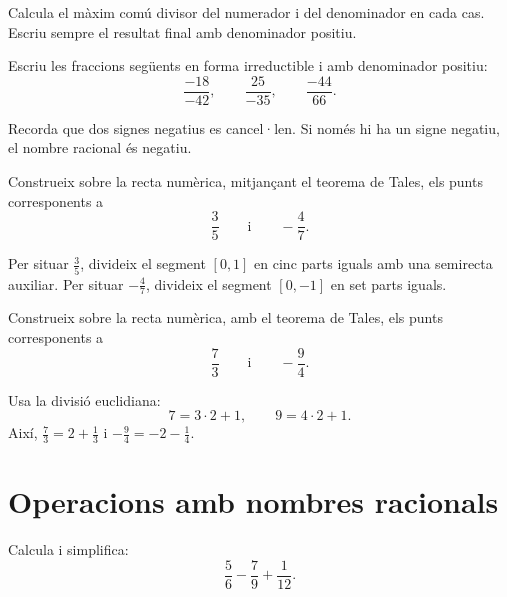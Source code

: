 \begin{indicacio}
	Calcula el màxim comú divisor del numerador i del denominador en cada cas. Escriu sempre el resultat final amb denominador positiu.
\end{indicacio}

\begin{exercici}
	Escriu les fraccions següents en forma irreductible i amb denominador positiu:
	\[
	\frac{-18}{-42},
	\qquad
	\frac{25}{-35},
	\qquad
	\frac{-44}{66}.
	\]
\end{exercici}

\begin{indicacio}
	Recorda que dos signes negatius es cancel·len. Si només hi ha un signe negatiu, el nombre racional és negatiu.
\end{indicacio}

\begin{exercici}
	Construeix sobre la recta numèrica, mitjançant el teorema de Tales, els punts corresponents a
	\[
	\frac{3}{5}
	\qquad\text{i}\qquad
	-\frac{4}{7}.
	\]
\end{exercici}

\begin{indicacio}
	Per situar \(\frac{3}{5}\), divideix el segment \([0,1]\) en cinc parts iguals amb una semirecta auxiliar. Per situar \(-\frac{4}{7}\), divideix el segment \([0,-1]\) en set parts iguals.
\end{indicacio}

\begin{exercici}
	Construeix sobre la recta numèrica, amb el teorema de Tales, els punts corresponents a
	\[
	\frac{7}{3}
	\qquad\text{i}\qquad
	-\frac{9}{4}.
	\]
\end{exercici}

\begin{indicacio}
	Usa la divisió euclidiana:
	\[
	7=3\cdot2+1,
	\qquad
	9=4\cdot2+1.
	\]
	Així, \(\frac{7}{3}=2+\frac{1}{3}\) i \(-\frac{9}{4}=-2-\frac{1}{4}\).
\end{indicacio}

\section{Operacions amb nombres racionals}

\begin{exercici}
	Calcula i simplifica:
	\[
	\frac{5}{6}
	-
	\frac{7}{9}
	+
	\frac{1}{12}.
	\]
\end{exercici}

